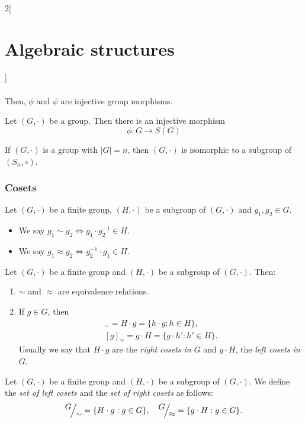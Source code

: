 \documentclass[../../../main.tex]{subfiles}
\begin{document}
\begin{multicols}{2}[\section{Algebraic structures}]
\begin{prop}
\begin{align*}
    \end{align*}
    Then, $\phi$ and $\psi$ are injective group morphisms.
\end{prop}
\begin{theorem}
    Let $(G,\cdot)$ be a group. Then there is an injective morphism $$\phi:G\longrightarrow S(G)$$
\end{theorem}
\begin{corollary}
    If $(G,\cdot)$ is a group with $|G|=n$, then $(G,\cdot)$ is isomorphic to a subgroup of $(S_n,\circ)$.
\end{corollary}
\subsubsection{Cosets}
\begin{definition}\label{AS_equiv} 
    Let $(G,\cdot)$ be a finite group, $(H,\cdot)$ be a subgroup of $(G,\cdot)$ and $g_1,g_2\in G$. 
    \begin{itemize}
        \item We say $g_1\sim g_2\iff g_1\cdot g_2^{-1}\in H$.
        \item We say $g_1\approx g_2\iff g_2^{-1}\cdot g_1\in H$.
    \end{itemize}
\end{definition}
\begin{lemma}
    Let $(G,\cdot)$ be a finite group and $(H,\cdot)$ be a subgroup of $(G,\cdot)$. Then:
    \begin{enumerate}
        \item $\sim$ and $\approx$ are equivalence relations.
        \item If $g\in G$, then 
        \begin{gather*}
            [g]_\sim=H\cdot g=\{h\cdot g:h\in H\},\\ [g]_\approx=g\cdot H=\{g\cdot h':h'\in H\}.
        \end{gather*}
        Usually we say that $H\cdot g$ are the \textit{right cosets in $G$} and $g\cdot H$, the \textit{left cosets in $G$}. 
    \end{enumerate}
\end{lemma}
\begin{definition}
    Let $(G,\cdot)$ be a finite group and $(H,\cdot)$ be a subgroup of $(G,\cdot)$. We define the \textit{set of left cosets} and the \textit{set of right cosets} as follows:
    $$\quot{G}{\sim}=\{H\cdot g:g\in G\},\quad\quot{G}{\approx}=\{g\cdot H:g\in G\}.$$
\end{definition}

\end{multicols}
\end{document}

